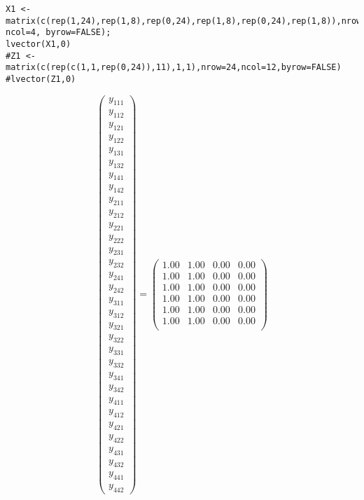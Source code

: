 \documentclass[11pt]{article}
\begin{document}
\begin{verbatim}
X1 <- matrix(c(rep(1,24),rep(1,8),rep(0,24),rep(1,8),rep(0,24),rep(1,8)),nrow=24, ncol=4, byrow=FALSE);
lvector(X1,0)
#Z1 <- matrix(c(rep(c(1,1,rep(0,24)),11),1,1),nrow=24,ncol=12,byrow=FALSE)
#lvector(Z1,0)
\end{verbatim}


\[
\begin{pmatrix} y_{111} \\ y_{112} \\ y_{121} \\ y_{122} \\ y_{131} \\ y_{132} \\ y_{141} \\ y_{142} \\
                y_{211} \\ y_{212} \\ y_{221} \\ y_{222} \\ y_{231} \\ y_{232} \\ y_{241} \\ y_{242} \\
                y_{311} \\ y_{312} \\ y_{321} \\ y_{322} \\ y_{331} \\ y_{332} \\ y_{341} \\ y_{342} \\
                y_{411} \\ y_{412} \\ y_{421} \\ y_{422} \\ y_{431} \\ y_{432} \\ y_{441} \\ y_{442} \end{pmatrix}
=
\begin{pmatrix}{}
  1.00 & 1.00 & 0.00 & 0.00 \\ 
  1.00 & 1.00 & 0.00 & 0.00 \\ 
  1.00 & 1.00 & 0.00 & 0.00 \\ 
  1.00 & 1.00 & 0.00 & 0.00 \\ 
  1.00 & 1.00 & 0.00 & 0.00 \\ 
  1.00 & 1.00 & 0.00 & 0.00 \\ 

\end{pmatrix}\]
\end{document}
